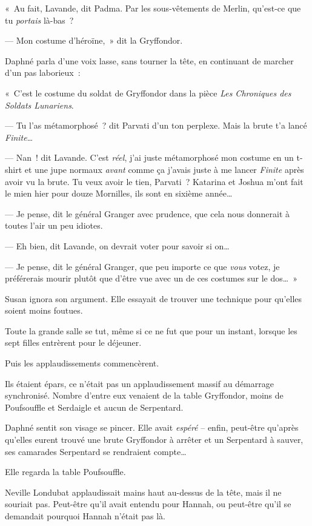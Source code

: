 «~Au fait, Lavande, dit Padma.
Par les sous-vêtements de Merlin, qu'est-ce que tu \emph{portais} là-bas~?

--- Mon costume d'héroïne,~» dit la Gryffondor.

Daphné parla d'une voix lasse, sans tourner la tête, en continuant de marcher d'un pas laborieux~:

«~C'est le costume du soldat de Gryffondor dans la pièce \emph{Les Chroniques des Soldats Lunariens}.

--- Tu l'as métamorphosé~? dit Parvati d'un ton perplexe.
Mais la brute t'a lancé \emph{Finite}…

--- Nan~! dit Lavande.
C'est \emph{réel}, j'ai juste métamorphosé mon costume en un t-shirt et une jupe normaux \emph{avant} comme ça j'avais juste à me lancer \emph{Finite} après avoir vu la brute.
Tu veux avoir le tien, Parvati~?
Katarina et Joshua m'ont fait le mien hier pour douze Mornilles, ils sont en sixième année…

--- Je pense, dit le général Granger avec prudence, que cela nous donnerait à toutes l'air un peu idiotes.

--- Eh bien, dit Lavande, on devrait voter pour savoir si on…

--- Je pense, dit le général Granger, que peu importe ce que \emph{vous} votez, je préférerais mourir plutôt que d'être vue avec un de ces costumes sur le dos…~»

Susan ignora son argument.
Elle essayait de trouver une technique pour qu'elles soient moins foutues.

\later

Toute la grande salle se tut, même si ce ne fut que pour un instant, lorsque les sept filles entrèrent pour le déjeuner.

Puis les applaudissements commencèrent.

Ils étaient épars, ce n'était pas un applaudissement massif au démarrage synchronisé.
Nombre d'entre eux venaient de la table Gryffondor, moins de Poufsouffle et Serdaigle et aucun de Serpentard.

Daphné sentit son visage se pincer.
Elle avait \emph{espéré} -- enfin, peut-être qu'après qu'elles eurent trouvé une brute Gryffondor à arrêter et un Serpentard à sauver, ses camarades Serpentard se rendraient compte…

Elle regarda la table Poufsouffle.

Neville Londubat applaudissait mains haut au-dessus de la tête, mais il ne souriait pas.
Peut-être qu'il avait entendu pour Hannah, ou peut-être qu'il se demandait pourquoi Hannah n'était pas là.

